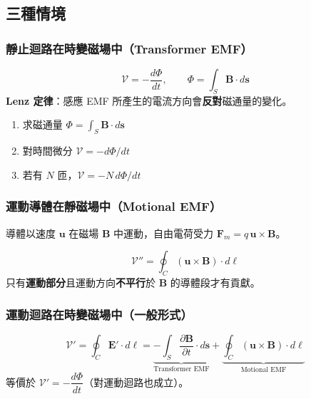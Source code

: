 \documentclass[12pt,a4paper]{article}
\newcommand{\vE}{\mathbf{E}}
\newcommand{\vB}{\mathbf{B}}
\newcommand{\vF}{\mathbf{F}}
\newcommand{\vu}{\mathbf{u}}
\newcommand{\emf}{\mathcal{V}}
\begin{document}
\subsection{三種情境}

\subsubsection{靜止迴路在時變磁場中（Transformer EMF）}

\begin{keybox}
\[
\emf = -\frac{d\Phi}{dt}, \qquad \Phi = \int_S \vB\cdot d\mathbf{s}
\]
\textbf{Lenz 定律}：感應 EMF 所產生的電流方向會\textbf{反對}磁通量的變化。
\end{keybox}

\begin{tipbox}[解題步驟]
\begin{enumerate}[nosep]
  \item 求磁通量 $\Phi = \int_S \vB\cdot d\mathbf{s}$
  \item 對時間微分 $\emf = -d\Phi/dt$
  \item 若有 $N$ 匝，$\emf = -N\,d\Phi/dt$
\end{enumerate}
\end{tipbox}

\subsubsection{運動導體在靜磁場中（Motional EMF）}

導體以速度 $\vu$ 在磁場 $\vB$ 中運動，自由電荷受力 $\vF_m = q\,\vu\times\vB$。

\begin{keybox}[動生 EMF]
\[
\emf'' = \oint_C (\vu\times\vB)\cdot d\boldsymbol{\ell}
\]
只有\textbf{運動部分}且運動方向\textbf{不平行}於 $\vB$ 的導體段才有貢獻。
\end{keybox}

\subsubsection{運動迴路在時變磁場中（一般形式）}

\begin{keybox}
\[
\emf' = \oint_C \vE'\cdot d\boldsymbol{\ell}
= \underbrace{-\int_S \frac{\partial\vB}{\partial t}\cdot d\mathbf{s}}_{\text{Transformer EMF}}
+ \underbrace{\oint_C (\vu\times\vB)\cdot d\boldsymbol{\ell}}_{\text{Motional EMF}}
\]
等價於 $\emf' = -\dfrac{d\Phi}{dt}$（對運動迴路也成立）。
\end{keybox}
\end{document}

